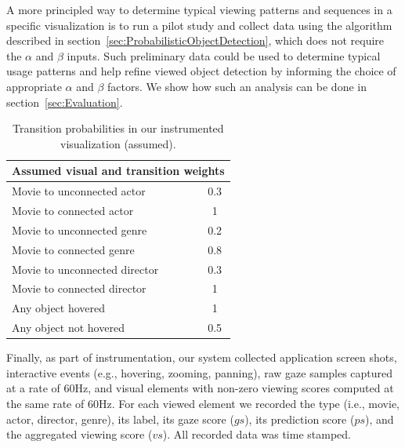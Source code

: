 A more principled way to determine typical viewing patterns and sequences in a specific visualization is to run a pilot study and collect data using the algorithm described in section~\ref{sec:ProbabilisticObjectDetection}, which does not require the $\alpha$ and $\beta$ inputs. Such preliminary data could be used to determine typical usage patterns and help refine viewed object detection by informing the choice of appropriate $\alpha$ and $\beta$ factors. We show how such an analysis can be done in section~\ref{sec:Evaluation}. 

\begin{table}[htbp]
	\centering
		\begin{tabular}{|l|c|}
			\hline
			 \multicolumn{2}{|c|}{Assumed visual and transition weights} \\ \hline
			Movie to unconnected actor & 0.3\\\hline
			Movie to connected actor & 1\\\hline
			Movie to unconnected genre & 0.2\\\hline
			Movie to connected genre & 0.8\\\hline
			Movie to unconnected director & 0.3\\\hline
			Movie to connected director & 1\\\hline
			Any object hovered & 1\\\hline
			Any object not hovered & 0.5\\
			\hline			
		\end{tabular}
	\caption{Transition probabilities in our instrumented visualization (assumed).}
	\label{tab:Transition2}
\end{table}

Finally, as part of instrumentation, our system collected application screen shots, interactive events (e.g., hovering, zooming, panning), raw gaze samples captured at a rate of $60$Hz, and visual elements with non-zero viewing scores computed at the same rate of $60$Hz. For each viewed element we recorded the type (i.e., movie, actor, director, genre), its label, its gaze score ($gs$), its prediction score ($ps$), and the aggregated viewing score ($vs$). All recorded data was time stamped.
